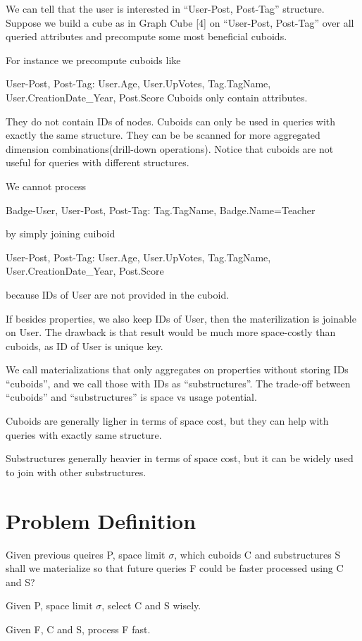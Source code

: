 We can tell that the user is interested in “User-Post, Post-Tag” structure. Suppose we build a cube as in Graph Cube [4] on “User-Post, Post-Tag” over all queried attributes and precompute some most beneficial cuboids. 

For instance we precompute cuboids like

User-Post, Post-Tag: User.Age, User.UpVotes, Tag.TagName, User.CreationDate\_Year, Post.Score
Cuboids only contain attributes. 

They do not contain IDs of nodes. Cuboids can only be used in queries with exactly the same structure. They can be be scanned for more aggregated dimension combinations(drill-down operations). Notice that cuboids are not useful for queries with different structures.

We cannot process

Badge-User, User-Post, Post-Tag: Tag.TagName, Badge.Name=Teacher

by simply  joining cuiboid

User-Post, Post-Tag: User.Age, User.UpVotes, Tag.TagName, User.CreationDate\_Year, Post.Score

because IDs of User are not provided in the cuboid.

If besides properties, we also keep IDs of User, then the materilization is joinable on User. The drawback is that result would be much more space-costly than cuboids, as ID of User is unique key. 

We call materializations that only aggregates on properties without storing IDs “cuboids”, and we call those with IDs as “substructures”. The trade-off between “cuboids” and “substructures” is space vs usage potential.

Cuboids are generally ligher in terms of space cost, but they can help with queries with exactly same structure.

Substructures generally heavier in terms of space cost, but it can be widely used to join with other substructures.




\section{Problem Definition}
Given previous queires P, space limit $\sigma$, which cuboids C and substructures S shall we materialize so that future queries F could be faster processed using C and S? 

Given P, space limit $\sigma$, select C and S wisely.

Given F, C and S, process F fast.

